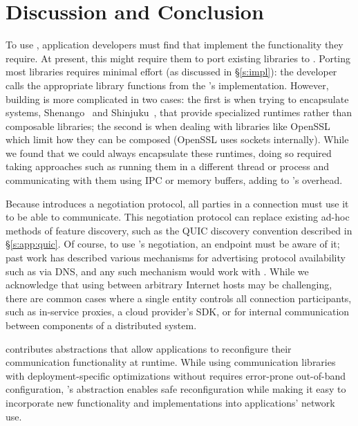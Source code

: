 \section{Discussion and Conclusion}\label{s:discussion}
To use \name, application developers must find \tunnels that implement the functionality they require.
At present, this might require them to port existing libraries to \name.
Porting most libraries requires minimal effort (as discussed in \S\ref{s:impl}): the developer calls the appropriate library functions from the \tunnel's implementation.
However, building \tunnels is more complicated in two cases: the first is when trying to encapsulate systems, \eg Shenango~\cite{shenango,caladan} and Shinjuku~\cite{shinjuku}, that provide specialized runtimes rather than composable libraries; the second is when dealing with libraries like OpenSSL~\cite{openssl} which limit how they can be composed (OpenSSL uses sockets internally). 
While we found that we could always encapsulate these runtimes, doing so required taking approaches such as running them in a different thread or process and communicating with them using IPC or memory buffers, adding to \name's overhead.

Because \name introduces a negotiation protocol, all parties in a connection must use it to be able to communicate.
This negotiation protocol can replace existing ad-hoc methods of feature discovery, such as the QUIC discovery convention described in \S\ref{s:app:quic}.
Of course, to use \name's negotiation, an endpoint must be aware of it; past work has described various mechanisms for advertising protocol availability such as via DNS, and any such mechanism would work with \name.
While we acknowledge that using \name between arbitrary Internet hosts may be challenging, there are common cases where a single entity controls all connection participants, such as in-service proxies,
a cloud provider's SDK, or for internal communication between components of a distributed system.

\name contributes abstractions that allow applications to reconfigure their communication functionality at runtime.
While using communication libraries with deployment-specific optimizations without \name requires error-prone out-of-band configuration, \name's \tunnel abstraction enables safe reconfiguration while making it easy to incorporate new functionality and implementations into applications' network use.
